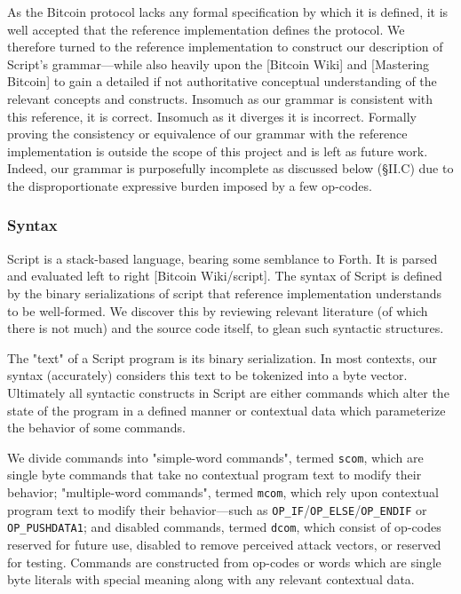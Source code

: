 \documentclass[letterpaper, 10 pt, conference]{ieeeconf}
\begin{document}
As the Bitcoin protocol lacks any formal specification by which it is defined, it is well accepted that the reference implementation defines the protocol. We therefore turned to the reference implementation to construct our description of Script's grammar---while also heavily upon the [Bitcoin Wiki] and [Mastering Bitcoin] to gain a detailed if not authoritative conceptual understanding of the relevant concepts and constructs. Insomuch as our grammar is consistent with this reference, it is correct. Insomuch as it diverges it is incorrect. Formally proving the consistency or equivalence of our grammar with the reference implementation is outside the scope of this project and is left as future work. Indeed, our grammar is purposefully incomplete as discussed below (\S II.C) due to the disproportionate expressive burden imposed by a few op-codes.
\subsubsection{Syntax}

Script is a stack-based language, bearing some semblance to Forth. It is parsed and evaluated left to right [Bitcoin Wiki/script]. The syntax of Script is defined by the binary serializations of script that reference implementation understands to be well-formed. We discover this by reviewing relevant literature (of which there is not much) and the source code itself, to glean such syntactic structures.

The "text" of a Script program is its binary serialization. In most contexts, our syntax (accurately) considers this text to be tokenized into a byte vector. Ultimately all syntactic constructs in Script are either commands which alter the state of the program in a defined manner or contextual data which parameterize the behavior of some commands.

We divide commands into "simple-word commands", termed \texttt{scom}, which are single byte commands that take no contextual program text to modify their behavior; "multiple-word commands", termed \texttt{mcom}, which rely upon contextual program text to modify their behavior---such as \texttt{OP\_IF}/\texttt{OP\_ELSE}/\texttt{OP\_ENDIF} or \texttt{OP\_PUSHDATA1}; and disabled commands, termed \texttt{dcom}, which consist of op-codes reserved for future use, disabled to remove perceived attack vectors, or reserved for testing. Commands are constructed from op-codes or words which are single byte literals with special meaning along with any relevant contextual data.
\end{document}
